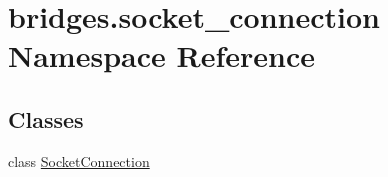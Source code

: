\hypertarget{namespacebridges_1_1socket__connection}{}\section{bridges.\+socket\+\_\+connection Namespace Reference}
\label{namespacebridges_1_1socket__connection}
\subsection*{Classes}
\begin{DoxyCompactItemize}
\item 
class \hyperlink{classbridges_1_1socket__connection_1_1_socket_connection}{Socket\+Connection}
\end{DoxyCompactItemize}
